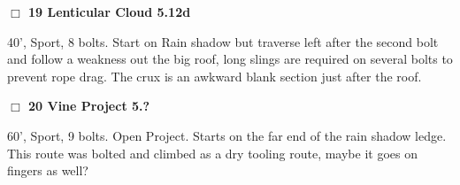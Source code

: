 \begin{multicols}{2}
\needspace{2em}
\label{rt:Lenticular Cloud}
\colorbox{Goldenrod!20}{
\parbox{0.95\linewidth}{
\hspace{-1ex}\textbf{$\Box$
19 Lenticular Cloud 5.12d  
}}}
\begin{adjustwidth}{1.3em}{}			

40', Sport, 8 bolts. Start on Rain shadow but traverse left after the second bolt and follow a weakness out the big roof, long slings are required on several bolts to prevent rope drag. The crux is an awkward blank section just after the roof.
\end{adjustwidth}




\needspace{2em}
\label{rt:Vine Project}
\colorbox{black!20}{
\parbox{0.95\linewidth}{
\hspace{-1ex}\textbf{$\Box$
20 Vine Project 5.?  
}}}
\begin{adjustwidth}{1.3em}{}			

60', Sport, 9 bolts. Open Project. Starts on the far end of the rain shadow ledge. This route was bolted and climbed as a dry tooling route, maybe it goes on fingers as well?
\end{adjustwidth}




	\end{multicols}
\label{tp:Garden Cliff Castle Black Area}
  \begin{landscape}
	
  \end{landscape}

